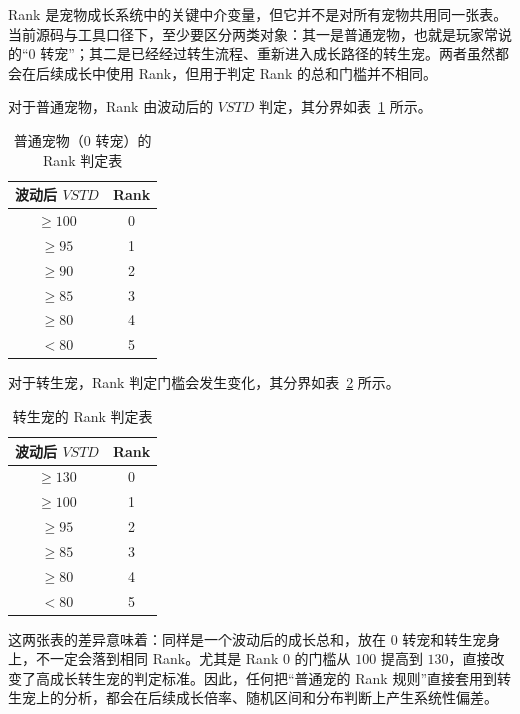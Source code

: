Rank 是宠物成长系统中的关键中介变量，但它并不是对所有宠物共用同一张表。当前源码与工具口径下，至少要区分两类对象：其一是普通宠物，也就是玩家常说的“0 转宠”；其二是已经经过转生流程、重新进入成长路径的转生宠。两者虽然都会在后续成长中使用 Rank，但用于判定 Rank 的总和门槛并不相同。

对于普通宠物，Rank 由波动后的 $VSTD$ 判定，其分界如表~\ref{tab:normal-rank} 所示。

\begin{table}[H]
    \centering
    \caption{普通宠物（0 转宠）的 Rank 判定表}
    \label{tab:normal-rank}
    \begin{tabular}{cc}
        \toprule
        波动后 $VSTD$ & Rank \\
        \midrule
        $\ge 100$ & 0 \\
        $\ge 95$  & 1 \\
        $\ge 90$  & 2 \\
        $\ge 85$  & 3 \\
        $\ge 80$  & 4 \\
        $<80$      & 5 \\
        \bottomrule
    \end{tabular}
\end{table}

对于转生宠，Rank 判定门槛会发生变化，其分界如表~\ref{tab:trans-rank} 所示。

\begin{table}[H]
    \centering
    \caption{转生宠的 Rank 判定表}
    \label{tab:trans-rank}
    \begin{tabular}{cc}
        \toprule
        波动后 $VSTD$ & Rank \\
        \midrule
        $\ge 130$ & 0 \\
        $\ge 100$ & 1 \\
        $\ge 95$  & 2 \\
        $\ge 85$  & 3 \\
        $\ge 80$  & 4 \\
        $<80$      & 5 \\
        \bottomrule
    \end{tabular}
\end{table}

这两张表的差异意味着：同样是一个波动后的成长总和，放在 0 转宠和转生宠身上，不一定会落到相同 Rank。尤其是 Rank 0 的门槛从 $100$ 提高到 $130$，直接改变了高成长转生宠的判定标准。因此，任何把“普通宠的 Rank 规则”直接套用到转生宠上的分析，都会在后续成长倍率、随机区间和分布判断上产生系统性偏差。

